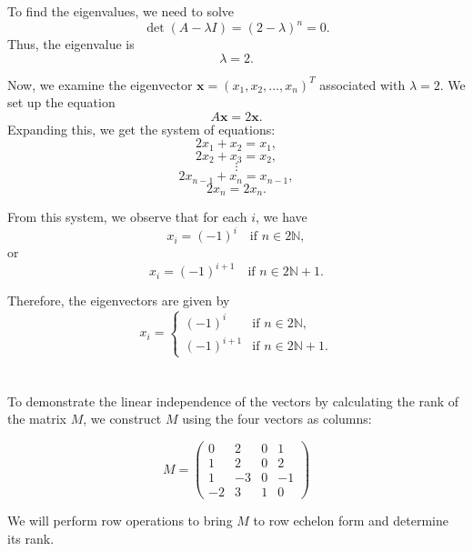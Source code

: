 \documentclass{article}
\begin{document}
To find the eigenvalues, we need to solve
\[
    \det(A - \lambda I) = (2 - \lambda)^n = 0.
\]
Thus, the eigenvalue is
\[
    \lambda = 2.
\]

Now, we examine the eigenvector \( \mathbf{x} = (x_1, x_2, \dots, x_n)^T \) associated with \( \lambda = 2 \). We set up the equation
\[
    A \mathbf{x} = 2 \mathbf{x}.
\]
Expanding this, we get the system of equations:
\[
    2 x_1 + x_2 = x_1,
\]
\[
    2 x_2 + x_3 = x_2,
\]
\[
    \vdots
\]
\[
    2 x_{n-1} + x_n = x_{n-1},
\]
\[
    2 x_n = 2 x_n.
\]

From this system, we observe that for each \( i \), we have
\[
    x_i = (-1)^i \quad \text{if } n \in 2 \mathbb{N},
\]
or
\[
    x_i = (-1)^{i+1} \quad \text{if } n \in 2\mathbb{N} + 1.
\]

Therefore, the eigenvectors are given by
\[
    x_i = \begin{cases}
        (-1)^i     & \text{if } n \in 2 \mathbb{N},    \\
        (-1)^{i+1} & \text{if } n \in 2\mathbb{N} + 1.
    \end{cases}
\]

\section{}
\subsection{}
To demonstrate the linear independence of the vectors by calculating the rank of the matrix \( M \), we construct \( M \) using the four vectors as columns:

\[
    M = \begin{pmatrix} 0 & 2 & 0 & 1 \\ 1 & 2 & 0 & 2 \\ 1 & -3 & 0 & -1 \\ -2 & 3 & 1 & 0 \end{pmatrix}
\]

We will perform row operations to bring \( M \) to row echelon form and determine its rank.
\end{document}
